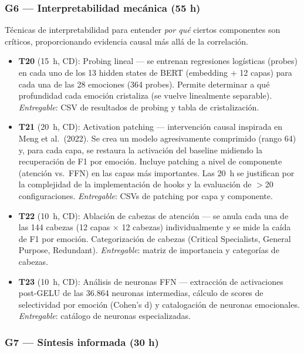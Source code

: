\documentclass[11pt, a4paper]{article}
\begin{document}
\subsubsection{G6 --- Interpretabilidad mecánica (55 h)}

Técnicas de interpretabilidad para entender \textit{por qué} ciertos componentes son críticos, proporcionando evidencia causal más allá de la correlación.

\begin{itemize}[nosep, leftmargin=1.2em, itemsep=2pt]
    \item \textbf{T20} (15~h, CD): Probing lineal --- se entrenan regresiones logísticas (probes) en cada uno de los 13 hidden states de BERT (embedding + 12 capas) para cada una de las 28 emociones (364 probes). Permite determinar a qué profundidad cada emoción cristaliza (se vuelve linealmente separable). \textit{Entregable}: CSV de resultados de probing y tabla de cristalización.
    \item \textbf{T21} (20~h, CD): Activation patching --- intervención causal inspirada en Meng et al.\ (2022). Se crea un modelo agresivamente comprimido (rango 64) y, para cada capa, se restaura la activación del baseline midiendo la recuperación de F1 por emoción. Incluye patching a nivel de componente (atención vs.\ FFN) en las capas más importantes. Las 20~h se justifican por la complejidad de la implementación de hooks y la evaluación de $>$20 configuraciones. \textit{Entregable}: CSVs de patching por capa y componente.
    \item \textbf{T22} (10~h, CD): Ablación de cabezas de atención --- se anula cada una de las 144 cabezas (12 capas $\times$ 12 cabezas) individualmente y se mide la caída de F1 por emoción. Categorización de cabezas (Critical Specialists, General Purpose, Redundant). \textit{Entregable}: matriz de importancia y categorías de cabezas.
    \item \textbf{T23} (10~h, CD): Análisis de neuronas FFN --- extracción de activaciones post-GELU de las 36.864 neuronas intermedias, cálculo de scores de selectividad por emoción (Cohen's d) y catalogación de neuronas emocionales. \textit{Entregable}: catálogo de neuronas especializadas.
\end{itemize}

\subsubsection{G7 --- Síntesis informada (30 h)}
\end{document}
